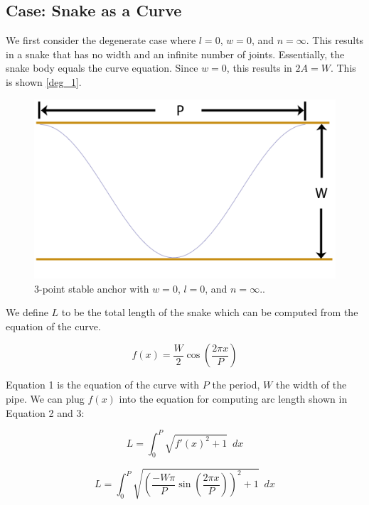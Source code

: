 \subsection{Case: Snake as a Curve}
\label{case:snakeasacurve}

We first consider the degenerate case where $l = 0$, $w = 0$, and $n = \infty $. This results in a snake that has no width and an infinite number of joints. Essentially, the snake body equals the curve equation. Since $w = 0$, this results in $ 2A = W $. This is shown \autoref{deg_1}.

\begin{figure}[htbp]
\centering
\includegraphics[keepaspectratio,width=400pt,height=0.75\textheight]{DegenerateCurve.png}
\caption{3-point stable anchor with $w = 0$, $l = 0$, and $n = \infty.$.}
\label{deg_1}
\end{figure}



We define $L$ to be the total length of the snake which can be computed from the equation of the curve.


\begin{equation}
f(x) =  \frac{W}{2} \cos \left( \frac{2 \pi x}{P} \right) 
\end{equation}


Equation 1 is the equation of the curve with $P$ the period, $W$ the width of the pipe. We can plug $f(x)$ into the equation for computing arc length shown in Equation 2 and 3:


\begin{equation}
L = \int_{0}^{P} \sqrt{f'(x)^2 + 1} \,\,\, dx
\end{equation}



\begin{equation}
L = \int_{0}^{P} \sqrt{\left( \frac{-W \pi}{P} \sin \left( \frac{2 \pi x}{P} \right)  \right)^2 + 1} \,\,\, dx
\end{equation}


